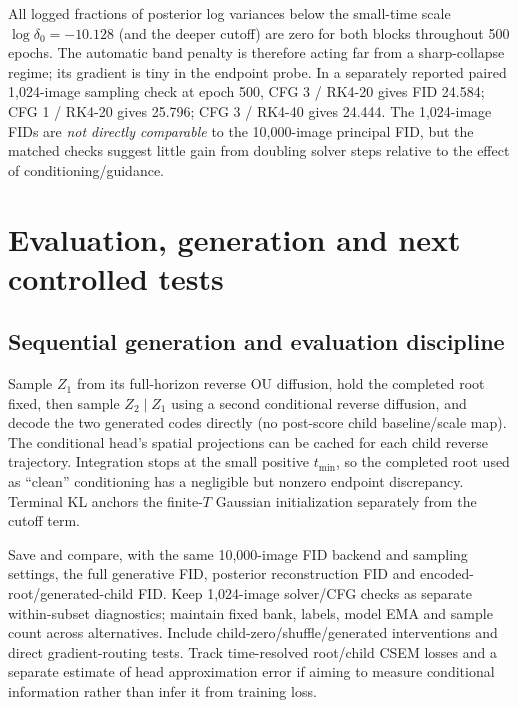 \documentclass[10pt]{article}
\begin{document}
All logged fractions of posterior log variances below the small-time scale $\log\delta_0=-10.128$ (and the deeper cutoff) are zero for both blocks throughout 500 epochs. The automatic band penalty is therefore acting far from a sharp-collapse regime; its gradient is tiny in the endpoint probe. In a separately reported paired 1,024-image sampling check at epoch 500, CFG 3 / RK4-20 gives FID 24.584; CFG 1 / RK4-20 gives 25.796; CFG 3 / RK4-40 gives 24.444. The 1,024-image FIDs are \emph{not directly comparable} to the 10,000-image principal FID, but the matched checks suggest little gain from doubling solver steps relative to the effect of conditioning/guidance.

\newpage
\section{Evaluation, generation and next controlled tests}
\subsection{Sequential generation and evaluation discipline}
Sample $Z_1$ from its full-horizon reverse OU diffusion, hold the completed root fixed, then sample $Z_2\mid Z_1$ using a second conditional reverse diffusion, and decode the two generated codes directly (no post-score child baseline/scale map). The conditional head's spatial projections can be cached for each child reverse trajectory. Integration stops at the small positive $t_{\min}$, so the completed root used as ``clean'' conditioning has a negligible but nonzero endpoint discrepancy. Terminal KL anchors the finite-$T$ Gaussian initialization separately from the cutoff term.

Save and compare, with the same 10,000-image FID backend and sampling settings, the full generative FID, posterior reconstruction FID and encoded-root/generated-child FID. Keep 1,024-image solver/CFG checks as separate within-subset diagnostics; maintain fixed bank, labels, model EMA and sample count across alternatives. Include child-zero/shuffle/generated interventions and direct gradient-routing tests. Track time-resolved root/child CSEM losses and a separate estimate of head approximation error if aiming to measure conditional information rather than infer it from training loss.
\end{document}
